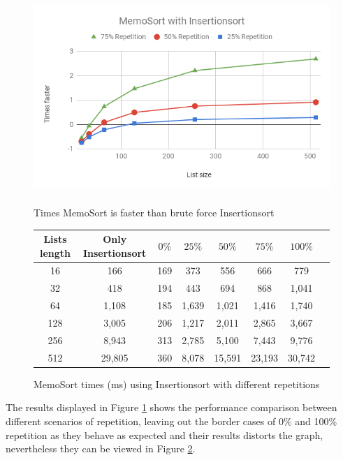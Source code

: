 \documentclass[a4paper,12pt]{article}
\begin{document}
\begin{figure}[H]
    \centering
    \includegraphics[height=8cm,keepaspectratio]{./images/MemoSortIns.png}
    \caption{Times MemoSort is faster than brute force Insertionsort }
    \label{fig:MemoSortInsGraph}
\end{figure}

\begin{figure}[H]
\centering
\begin{tabular}{|c|c|c|c|c|c|c|c|}  \toprule
	{Lists length} & {Only Insertionsort} & {$0\%$} & {$25\%$} & {$50\%$} & {$75\%$} & {$100\%$} \\ \midrule
	16 &166&169&373 & 556 & 666 & 779\\ 
	32 &418&194&443 & 694& 868& 1,041\\ 
	64 &1,108&185 &1,639&1,021&1,416& 1,740\\ 
	128 &3,005&206&1,217&2,011&2,865 &3,667\\ 
	256 &8,943&313&2,785 &5,100&7,443&9,776\\ 
	512 &29,805 & 360&8,078 &15,591 &23,193 &30,742\\ \bottomrule
\end{tabular}
\caption{MemoSort times (ms) using Insertionsort with different repetitions}
\label{fig:MemoSortInsTable}
\end{figure}

The results displayed in Figure \ref{fig:MemoSortInsGraph} shows the performance comparison between different scenarios of repetition, leaving out the border cases of 0\% and 100\% repetition as they behave as expected and their results distorts the graph, nevertheless they can be viewed in Figure \ref{fig:MemoSortInsTable}. \\
\end{document}

